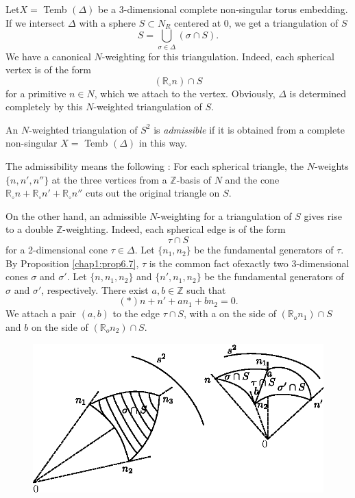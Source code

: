 Let\pageoriginale $X =$ Temb $(\Delta)$ be a  3-dimensional complete
non-singular torus embedding. If we intersect $\Delta$ with a sphere
$S \subset N_R$ centered at 0, we get a triangulation of $S$  
$$
S = \bigcup_{\sigma \in \Delta} (\sigma \cap S).
$$
We have a canonical $N$-weighting for this triangulation. Indeed, each
spherical vertex is of the form 
$$
(\mathbb{R}_\circ n)\cap S
$$
for a primitive $n \in N$, which we attach to the vertex. Obviously,
$\Delta$ is determined completely by this $N$-weighted triangulation of
$S$. 

\begin{defi*}
An $N$-weighted triangulation of $S^2$ is \textit{admissible} if it is
obtained from a complete non-singular $X = $ Temb $ (\Delta)$ in this
way. 
\end{defi*}

The admissibility means the following : For each spherical triangle,
the $N$-weights $\{n,n',n''\}$ at the three vertices from a
$\mathbb{Z}$-basis of $N$ and the cone $\mathbb{R}_\circ n +
\mathbb{R}_\circ n' + \mathbb{R}_\circ n''$ cuts  out
the original triangle on $S$. 

On the other hand, an admissible $N$-weighting for a triangulation of
$S$ gives rise to a double $\mathbb{Z}$-weighting. Indeed, each
spherical edge is of the form 
$$
\tau \cap S
$$
for a 2-dimensional cone $\tau \in \Delta$. Let $\{n_1, n_2\}$ be
the fundamental generators of $\tau$. By Proposition
\ref{chap1:prop6.7}, $\tau$ is 
the common fact of\pageoriginale exactly two 3-dimensional cones
$\sigma$ and $\sigma'$. Let  $\{n,n_1, n_2\}$ and  $\{n',n_1, n_2\}$
be the fundamental generators of $\sigma$ and $\sigma'$,
respectively. There exist $a, b\in \mathbb{Z}$ such that   
$$
(*) n+n' +an_1 +bn_2 = 0.
$$
We attach a pair  $(a,b)$ to the edge  $\tau \cap S$, with a on the
side of $(\mathbb{R}_on_1) \cap S$ and $b$ on the side of
$(\mathbb{R}_on_2)\cap S$.  
\begin{figure}[H]
\centering 
\includegraphics{vol58-fig/fig58-21.eps} 
\end{figure}


